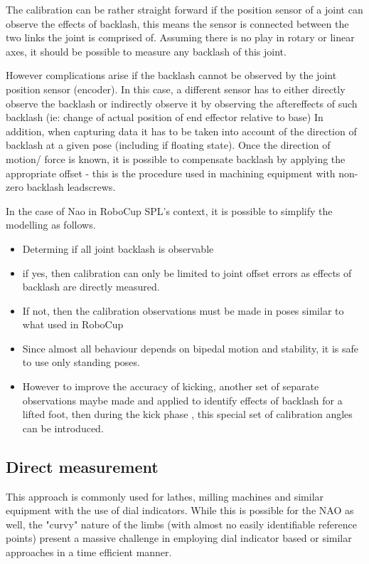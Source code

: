 \documentclass[english, printversion, nomenclature, notitle]{tuvisionthesis} %
\begin{document}
The calibration can be rather straight forward if the position sensor of a joint can observe the effects of backlash, this means the sensor is connected between the two links the joint is comprised of. Assuming there is no play in rotary or linear axes, it should be possible to measure any backlash of this joint.

However complications arise if the backlash cannot be observed by the joint position sensor (encoder). In this case, a different sensor has to either directly observe the backlash or indirectly observe it by observing the aftereffects of such backlash (ie: change of actual position of end effector relative to base)  In addition, when capturing data it has to be taken into account of the direction of backlash at a given pose (including if floating state). Once the direction of motion/ force is known, it is possible to compensate backlash by applying the appropriate offset - this is the procedure used in machining equipment with non-zero backlash leadscrews.

In the case of Nao in RoboCup SPL's context, it is possible to simplify the modelling as follows.
\begin{itemize}
	\item Determing if all joint backlash is observable
	\item if yes, then calibration can only be limited to joint offset errors as effects of backlash are directly measured.
	\item If not, then the calibration observations must be made in poses similar to what used in RoboCup
	\item Since almost all behaviour depends on bipedal motion and stability, it is safe to use only standing poses. 
	\item However to improve the accuracy of kicking, another set of separate observations maybe made and applied to identify effects of backlash for a lifted foot, then during the kick phase , this special set of calibration angles can be introduced.
\end{itemize}

\subsection{Direct measurement}

This approach is commonly used for lathes, milling machines and similar equipment with the use of dial indicators. While this is possible for the NAO as well, the "curvy" nature of the limbs (with almost no easily identifiable reference points) present a massive challenge in employing dial indicator based or similar approaches in a time efficient manner.
\end{document}
